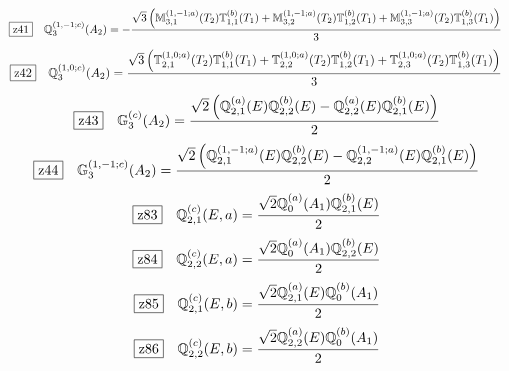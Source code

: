 \documentclass[fleqn,10pt,landscape]{jsarticle}
\begin{document}
\begin{dmath*}
\hspace*{3mm}\fbox{z41}\quad \mathbb{Q}_{3}^{(1,-1;c)}(A_{2})=- \frac{\sqrt{3} \left(\mathbb{M}_{3,1}^{(1,-1;a)}(T_{2}) \mathbb{T}_{1,1}^{(b)}(T_{1}) + \mathbb{M}_{3,2}^{(1,-1;a)}(T_{2}) \mathbb{T}_{1,2}^{(b)}(T_{1}) + \mathbb{M}_{3,3}^{(1,-1;a)}(T_{2}) \mathbb{T}_{1,3}^{(b)}(T_{1})\right)}{3}
\end{dmath*}
\begin{dmath*}
\hspace*{3mm}\fbox{z42}\quad \mathbb{Q}_{3}^{(1,0;c)}(A_{2})=\frac{\sqrt{3} \left(\mathbb{T}_{2,1}^{(1,0;a)}(T_{2}) \mathbb{T}_{1,1}^{(b)}(T_{1}) + \mathbb{T}_{2,2}^{(1,0;a)}(T_{2}) \mathbb{T}_{1,2}^{(b)}(T_{1}) + \mathbb{T}_{2,3}^{(1,0;a)}(T_{2}) \mathbb{T}_{1,3}^{(b)}(T_{1})\right)}{3}
\end{dmath*}
\begin{dmath*}
\hspace*{3mm}\fbox{z43}\quad \mathbb{G}_{3}^{(c)}(A_{2})=\frac{\sqrt{2} \left(\mathbb{Q}_{2,1}^{(a)}(E) \mathbb{Q}_{2,2}^{(b)}(E) - \mathbb{Q}_{2,2}^{(a)}(E) \mathbb{Q}_{2,1}^{(b)}(E)\right)}{2}
\end{dmath*}
\begin{dmath*}
\hspace*{3mm}\fbox{z44}\quad \mathbb{G}_{3}^{(1,-1;c)}(A_{2})=\frac{\sqrt{2} \left(\mathbb{Q}_{2,1}^{(1,-1;a)}(E) \mathbb{Q}_{2,2}^{(b)}(E) - \mathbb{Q}_{2,2}^{(1,-1;a)}(E) \mathbb{Q}_{2,1}^{(b)}(E)\right)}{2}
\end{dmath*}
\begin{dmath*}
\hspace*{3mm}\fbox{z83}\quad \mathbb{Q}_{2,1}^{(c)}(E,a)=\frac{\sqrt{2} \mathbb{Q}_{0}^{(a)}(A_{1}) \mathbb{Q}_{2,1}^{(b)}(E)}{2}
\end{dmath*}
\begin{dmath*}
\hspace*{3mm}\fbox{z84}\quad \mathbb{Q}_{2,2}^{(c)}(E,a)=\frac{\sqrt{2} \mathbb{Q}_{0}^{(a)}(A_{1}) \mathbb{Q}_{2,2}^{(b)}(E)}{2}
\end{dmath*}
\begin{dmath*}
\hspace*{3mm}\fbox{z85}\quad \mathbb{Q}_{2,1}^{(c)}(E,b)=\frac{\sqrt{2} \mathbb{Q}_{2,1}^{(a)}(E) \mathbb{Q}_{0}^{(b)}(A_{1})}{2}
\end{dmath*}
\begin{dmath*}
\hspace*{3mm}\fbox{z86}\quad \mathbb{Q}_{2,2}^{(c)}(E,b)=\frac{\sqrt{2} \mathbb{Q}_{2,2}^{(a)}(E) \mathbb{Q}_{0}^{(b)}(A_{1})}{2}
\end{dmath*}
\end{document}
